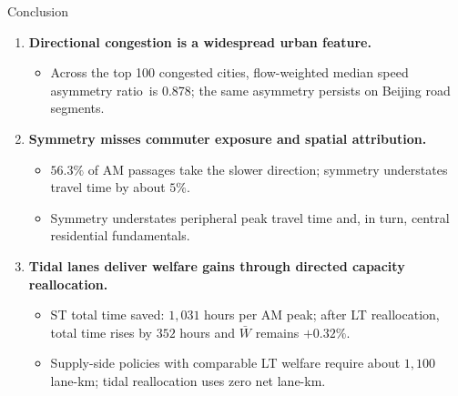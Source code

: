 \documentclass[11pt,aspectratio=169]{beamer}
\newcommand{\good}[1]{\textcolor{blue!70!black}{#1}}
\newcommand{\bad}[1]{\textcolor{red!70!black}{#1}}
\newcommand{\SAR}{speed asymmetry ratio}
\begin{document}
\begin{frame}{Conclusion}
\begin{enumerate}
  \item \textbf{Directional congestion is a widespread urban feature.}
  \begin{itemize}\footnotesize
    \item Across the top 100 congested cities, flow-weighted median \SAR\ is \good{0.878}; the same asymmetry persists on Beijing road segments.
  \end{itemize}
  \item \textbf{Symmetry misses commuter exposure and spatial attribution.}
  \begin{itemize}\footnotesize
    \item \good{$56.3\%$} of AM passages take the slower direction; symmetry understates travel time by \good{about $5\%$}.
    \item Symmetry understates peripheral peak travel time and, in turn, central residential fundamentals.
  \end{itemize}
  \item \textbf{Tidal lanes deliver welfare gains through directed capacity reallocation.}
  \begin{itemize}\footnotesize
    \item ST total time saved: \good{$1{,}031$ hours per AM peak}; after LT reallocation, total time rises by \bad{$352$ hours} and $\bar W$ remains \good{$+0.32\%$}.
    \item Supply-side policies with comparable LT welfare require about \bad{$1{,}100$ lane-km}; tidal reallocation uses \good{zero net lane-km}.
  \end{itemize}
\end{enumerate}
\end{frame}

\appendix
\end{document}
